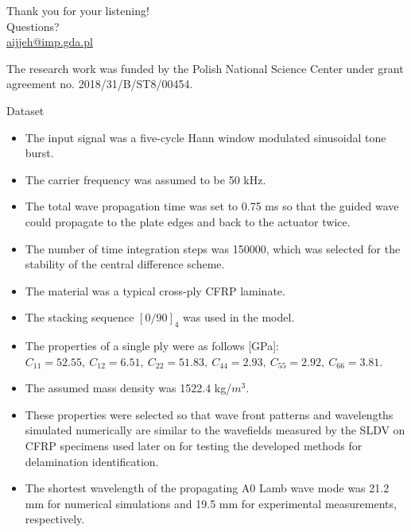 \documentclass[10pt,aspectratio=169,dvipsnames]{beamer} %
\begin{document}
	{
		\begin{frame}[standout]
			Thank you for your listening!\\ \vspace{12pt}
			Questions?\\ \vspace{12pt}
			\url{aijjeh@imp.gda.pl}
			\par\medskip
			\par\medskip
			\footnotesize
			The research work was funded by the Polish National Science Center under grant agreement no. 2018/31/B/ST8/00454.
		\end{frame}
	}
	\begin{frame}[standout]{Dataset}
		\tiny
		\begin{itemize}
			\item The input signal was a five-cycle Hann window modulated sinusoidal tone burst. 
			\item The carrier frequency was assumed to be 50 kHz. 
			\item The total wave propagation time was set to 0.75 ms so that the guided wave could propagate to the plate edges and back to the actuator twice. 
			\item The number of time integration steps was 150000, which was selected for the stability of the central difference scheme.
			\item The material was a typical cross-ply CFRP laminate. 
			\item The stacking sequence \([0/90]_4\) was used in the model. 
			\item The properties of a single ply were as follows [GPa]: \(C_{11}=52.55,\ C_{12}=6.51,\ C_{22}=51.83,\ C_{44}=2.93,\ C_{55}=2.92,\ C_{66}=3.81\). 
			\item The assumed mass density was 1522.4 kg/\(m^3\). 
			\item These properties were selected so that wave front patterns and wavelengths simulated numerically are similar to the wavefields measured by the SLDV on CFRP specimens used later on for testing the developed methods for delamination identification. 
			\item The shortest wavelength of the propagating A0 Lamb wave mode was 21.2 mm for numerical simulations and 19.5 mm for experimental measurements, respectively.
		\end{itemize}		
	\end{frame}
\end{document}
